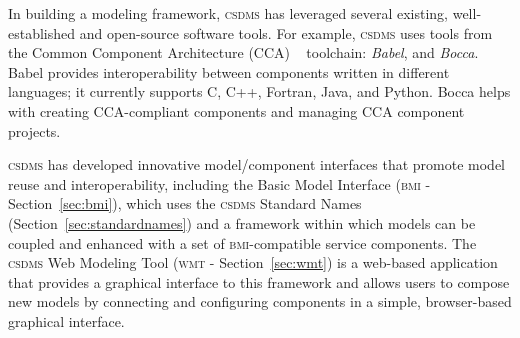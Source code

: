\documentclass[11pt, oneside]{amsart}
\DeclareRobustCommand{\csdms}{\textsc{csdms}}
\DeclareRobustCommand{\bmi}{\textsc{bmi}}
\DeclareRobustCommand{\wmt}{\textsc{wmt}}
\begin{document}
In building a modeling framework, \csdms{} has leveraged
several existing, well-established and open-source software tools. For example,
\csdms{} uses tools from the Common Component Architecture (CCA)
~\cite{armstrong1999toward} toolchain: \emph{Babel}, and \emph{Bocca}. Babel
provides interoperability between components
written in different languages; it currently supports C, C++, Fortran, Java,
and Python. Bocca helps with creating CCA-compliant components and managing CCA
component projects.

\csdms{} has developed innovative model/component interfaces that promote
model reuse and interoperability,
including the Basic Model Interface (\bmi{} - Section~\ref{sec:bmi}), which
uses
the \csdms{} Standard Names (Section~\ref{sec:standardnames}) and a framework
within which models can be coupled and enhanced with a set of \bmi{}-compatible
service components.
The \csdms{} Web Modeling Tool (\wmt{} - Section~\ref{sec:wmt}) is a web-based application that provides a
graphical interface to this framework and allows users to compose new models
by connecting and configuring components in a simple, browser-based graphical
interface.
\end{document}
